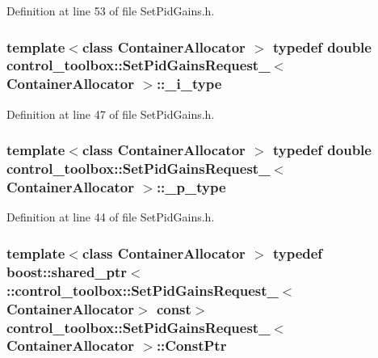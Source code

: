 \-Definition at line 53 of file \-Set\-Pid\-Gains.\-h.

\subsubsection[{\-\_\-i\-\_\-type}]{\setlength{\rightskip}{0pt plus 5cm}template$<$class Container\-Allocator $>$ typedef double {\bf control\-\_\-toolbox\-::\-Set\-Pid\-Gains\-Request\-\_\-}$<$ \-Container\-Allocator $>$\-::{\bf \-\_\-i\-\_\-type}}\label{structcontrol__toolbox_1_1SetPidGainsRequest___a1155e25643952dbb5dbd3b98cfc64198}


\-Definition at line 47 of file \-Set\-Pid\-Gains.\-h.

\subsubsection[{\-\_\-p\-\_\-type}]{\setlength{\rightskip}{0pt plus 5cm}template$<$class Container\-Allocator $>$ typedef double {\bf control\-\_\-toolbox\-::\-Set\-Pid\-Gains\-Request\-\_\-}$<$ \-Container\-Allocator $>$\-::{\bf \-\_\-p\-\_\-type}}\label{structcontrol__toolbox_1_1SetPidGainsRequest___a6b49370dfbe5e56d7751a8e317314fad}


\-Definition at line 44 of file \-Set\-Pid\-Gains.\-h.

\subsubsection[{\-Const\-Ptr}]{\setlength{\rightskip}{0pt plus 5cm}template$<$class Container\-Allocator $>$ typedef boost\-::shared\-\_\-ptr$<$ \-::{\bf control\-\_\-toolbox\-::\-Set\-Pid\-Gains\-Request\-\_\-}$<$\-Container\-Allocator$>$ const$>$ {\bf control\-\_\-toolbox\-::\-Set\-Pid\-Gains\-Request\-\_\-}$<$ \-Container\-Allocator $>$\-::{\bf \-Const\-Ptr}}\label{structcontrol__toolbox_1_1SetPidGainsRequest___a8ef26ed0d11ce35e47e0b74ebd6b3330}


